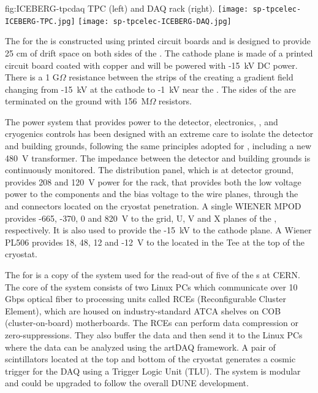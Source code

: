 \begin{dunefigure}
  {fig:ICEBERG-tpcdaq}
	{ TPC (left) and DAQ rack (right).}
  \texttt{[image: sp-tpcelec-ICEBERG-TPC.jpg]}
  \texttt{[image: sp-tpcelec-ICEBERG-DAQ.jpg]}
\end{dunefigure}

The  for the  is constructed using printed circuit boards and is 
designed to provide 25 cm of drift space on both sides of the . The cathode 
plane is made of a printed circuit board coated with copper and will be powered with 
-15~kV DC power. There is a 1 G$\Omega$ resistance between the strips of the 
creating a gradient field changing from -15~kV at the cathode to -1~kV near the 
. The sides of the  are terminated on the 
ground with 156~M$\Omega$ resistors. 

The  power system that provides power to the detector, electronics, 
, and cryogenics controls has been designed with an extreme care to 
isolate the detector and building grounds, following the same principles adopted
for , including a new 480~V transformer. The impedance between the detector
and building grounds is continuously monitored. The distribution panel, which is 
at detector ground, provides 208 and 120~V power for the  rack, that
provides both the low voltage power to the  components and the bias 
voltage to the  wire planes, through the  and 
connectors located on the cryostat penetration. A single WIENER MPOD  provides 
-665, -370, 0 and 820~V to the grid, U, V and X planes of the ,
respectively. It is also used to provide the -15~kV to the cathode plane. A Wiener 
PL506 provides 18, 48, 12 and -12~V to the  located in the Tee at
the top of the cryostat. 

The  for  is a copy of the system used for the read-out
of five of the  s at CERN. The core of the  system 
consists of two Linux PCs which communicate over 10 Gbps optical fiber
to processing units called RCEs (Reconfigurable Cluster Element), which are 
housed on industry-standard ATCA shelves on COB (cluster-on-board) motherboards.
The RCEs can perform data compression or zero-suppressions. They also buffer
the data and then send it to the Linux PCs where the data can be analyzed 
using the artDAQ framework. A pair of scintillators located at the top and bottom 
of the cryostat generates a cosmic trigger for the DAQ  using a Trigger Logic Unit (TLU).
The system is modular and could be upgraded to follow the overall DUNE  
development. 

